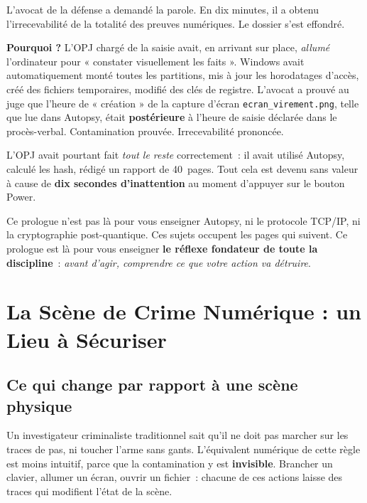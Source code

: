 \medskip

L'avocat de la défense a demandé la parole. En dix minutes, il a obtenu
l'irrecevabilité de la totalité des preuves numériques. Le dossier s'est
effondré.

\begin{boxalert}
\textbf{Pourquoi ?} L'OPJ chargé de la saisie avait, en arrivant sur place,
\emph{allumé} l'ordinateur pour « constater visuellement les faits ». Windows
avait automatiquement monté toutes les partitions, mis à jour les horodatages
d'accès, créé des fichiers temporaires, modifié des clés de registre. L'avocat
a prouvé au juge que l'heure de « création » de la capture d'écran
\texttt{ecran\_virement.png}, telle que lue dans Autopsy, était
\textbf{postérieure} à l'heure de saisie déclarée dans le procès-verbal.
Contamination prouvée. Irrecevabilité prononcée.

L'OPJ avait pourtant fait \emph{tout le reste} correctement~: il avait utilisé
Autopsy, calculé les hash, rédigé un rapport de 40~pages. Tout cela est devenu
sans valeur à cause de \textbf{dix secondes d'inattention} au moment d'appuyer
sur le bouton Power.
\end{boxalert}

\medskip

Ce prologue n'est pas là pour vous enseigner Autopsy, ni le protocole TCP/IP,
ni la cryptographie post-quantique. Ces sujets occupent les pages qui
suivent. Ce prologue est là pour vous enseigner \textbf{le réflexe fondateur
de toute la discipline}~: \emph{avant d'agir, comprendre ce que votre action
va détruire}.

\separateur

\section{La Scène de Crime Numérique : un Lieu à Sécuriser}

\subsection{Ce qui change par rapport à une scène physique}

Un investigateur criminaliste traditionnel sait qu'il ne doit pas marcher
sur les traces de pas, ni toucher l'arme sans gants. L'équivalent numérique
de cette règle est moins intuitif, parce que la contamination y est
\textbf{invisible}. Brancher un clavier, allumer un écran, ouvrir un
fichier~: chacune de ces actions laisse des traces qui modifient l'état
de la scène.


